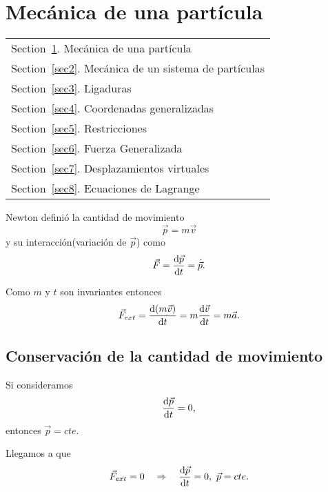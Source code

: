 \documentclass[../main]{subfiles}
\begin{document}
\section{Mecánica de una partícula}\label{sec1}
\begin{margintable}\vspace{1.4in}\footnotesize
		\begin{tabularx}{\marginparwidth}{|X}
        Section~\ref{sec1}. Mecánica de una partícula\\
        Section~\ref{sec2}. Mecánica de un sistema de partículas\\
        Section~\ref{sec3}. Ligaduras\\
        Section~\ref{sec4}. Coordenadas generalizadas\\
        Section~\ref{sec5}. Restricciones\\
        Section~\ref{sec6}. Fuerza Generalizada\\
        Section~\ref{sec7}. Desplazamientos virtuales\\
        Section~\ref{sec8}. Ecuaciones de Lagrange\\
		\end{tabularx}
        \end{margintable}
Newton definió la cantidad de movimiento
\begin{equation}
    \vec{p}=m\vec{v}
\end{equation}
y su interacción(variación de $\vec{p}$) como
\begin{equation}
    \vec{F}=\dv{\vec{p}}{t}=\dot{\vec{p}}.
\end{equation}

Como $m$ y $t$ son invariantes entonces
\begin{equation}
    \vec{F}_{ext}=\dv{(m\vec{v})}{t}=m\dv{\vec{v}}{t}=m\vec{a}.
\end{equation}

\subsection{Conservación de la cantidad de movimiento}
Si consideramos
\begin{equation}
    \dv{\vec{p}}{t}=0,
\end{equation}
entonces $\vec{p}=cte$.

Llegamos a que
\begin{equation}
    \vec{F}_{ext}=0 \quad \Rightarrow \quad \dv{\vec{p}}{t}=0, \ \vec{p}=cte.
\end{equation}
\end{document}
